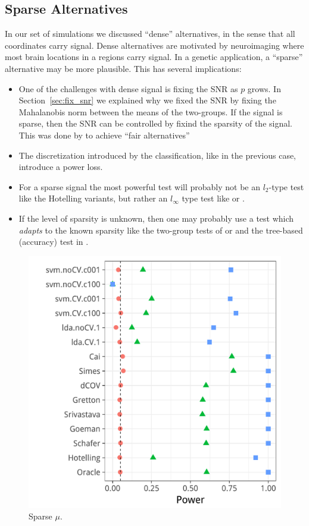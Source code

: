 \documentclass[journal]{IEEEtran}
\begin{document}
\subsection{Sparse Alternatives}
In our set of simulations we discussed ``dense'' alternatives, in the sense that all coordinates carry signal.
Dense alternatives are motivated by neuroimaging where most brain locations in a regions carry signal.
In a genetic application, a ``sparse'' alternative may be more plausible. 
This has several implications:
\begin{itemize}
	\item One of the challenges with dense signal is fixing the SNR as $p$ grows. In Section~\ref{sec:fix_snr} we explained why we fixed the SNR by fixing the Mahalanobis norm between the means of the two-groups. If the signal is sparse, then the SNR can be controlled by fixind the sparsity of the signal. This was done by \cite{ramdas2015decreasing} to achieve ``fair alternatives''
	
	\item The discretization introduced by the classification, like in the previous case, introduce a power loss. 
	
	\item For a sparse signal the most powerful test will probably not be an $l_2$-type test like the Hotelling variants, but rather an $l_\infty$ type test like \cite{tony2014two} or \cite{chang2014simulation}.
	
	\item If the level of sparsity is unknown, then one may probably use a test which \emph{adapts} to the known sparsity like the two-group tests of  \cite{simes1986improved,donoho2004higher,fan2007many,kosorok2007marginal,lopes2011more,zhong2013tests} or \cite{shen2015adaptive} and the tree-based (accuracy) test in \cite{yu2007two}.
	
\end{itemize}


\begin{figure}[ht]
	\centering
	\label{fig:sparse}	
	\centering
	\includegraphics[width=0.5\columnwidth]{"art/file34"}
	\caption{Sparse $\mu$.}  
\end{figure}
\end{document}
